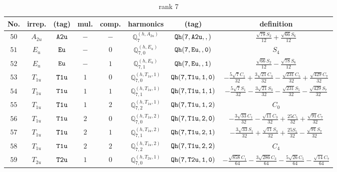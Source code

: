 \documentclass[fleqn,8pt]{jsarticle}
\begin{document}
\begin{table}[ht!]
\begin{center}
\caption{rank 7}
\renewcommand{\arraystretch}{1.3}
\begin{tabular}{cccccccc} \hline \hline
No. & irrep. & (tag) & mul. & comp. & harmonics & (tag) & definition \\ \hline
$ 50 $ & $ A_{2u} $ & $ {\tt A2u} $ & $ - $ & $ - $ & $ \mathbb{Q}_{7}^{(h,A_{2u})} $ & $ {\tt Qh(7,A2u,,)} $ & $ \frac{\sqrt{78} S_{2}}{12} + \frac{\sqrt{66} S_{6}}{12} $ \\
$ 51 $ & $ E_{u} $ & $ {\tt Eu} $ & $ - $ & $ 0 $ & $ \mathbb{Q}_{7,0}^{(h,E_{u})} $ & $ {\tt Qh(7,Eu,,0)} $ & $ S_{4} $ \\
$ 52 $ & $ E_{u} $ & $ {\tt Eu} $ & $ - $ & $ 1 $ & $ \mathbb{Q}_{7,1}^{(h,E_{u})} $ & $ {\tt Qh(7,Eu,,1)} $ & $ \frac{\sqrt{66} S_{2}}{12} - \frac{\sqrt{78} S_{6}}{12} $ \\
$ 53 $ & $ T_{1u} $ & $ {\tt T1u} $ & $ 1 $ & $ 0 $ & $ \mathbb{Q}_{7,0}^{(h,T_{1u},1)} $ & $ {\tt Qh(7,T1u,1,0)} $ & $ - \frac{5 \sqrt{7} C_{1}}{32} + \frac{3 \sqrt{21} C_{3}}{32} - \frac{\sqrt{231} C_{5}}{32} + \frac{\sqrt{429} C_{7}}{32} $ \\
$ 54 $ & $ T_{1u} $ & $ {\tt T1u} $ & $ 1 $ & $ 1 $ & $ \mathbb{Q}_{7,1}^{(h,T_{1u},1)} $ & $ {\tt Qh(7,T1u,1,1)} $ & $ - \frac{5 \sqrt{7} S_{1}}{32} - \frac{3 \sqrt{21} S_{3}}{32} - \frac{\sqrt{231} S_{5}}{32} - \frac{\sqrt{429} S_{7}}{32} $ \\
$ 55 $ & $ T_{1u} $ & $ {\tt T1u} $ & $ 1 $ & $ 2 $ & $ \mathbb{Q}_{7,2}^{(h,T_{1u},1)} $ & $ {\tt Qh(7,T1u,1,2)} $ & $ C_{0} $ \\
$ 56 $ & $ T_{1u} $ & $ {\tt T1u} $ & $ 2 $ & $ 0 $ & $ \mathbb{Q}_{7,0}^{(h,T_{1u},2)} $ & $ {\tt Qh(7,T1u,2,0)} $ & $ - \frac{3 \sqrt{33} C_{1}}{32} - \frac{\sqrt{11} C_{3}}{32} + \frac{25 C_{5}}{32} + \frac{\sqrt{91} C_{7}}{32} $ \\
$ 57 $ & $ T_{1u} $ & $ {\tt T1u} $ & $ 2 $ & $ 1 $ & $ \mathbb{Q}_{7,1}^{(h,T_{1u},2)} $ & $ {\tt Qh(7,T1u,2,1)} $ & $ - \frac{3 \sqrt{33} S_{1}}{32} + \frac{\sqrt{11} S_{3}}{32} + \frac{25 S_{5}}{32} - \frac{\sqrt{91} S_{7}}{32} $ \\
$ 58 $ & $ T_{1u} $ & $ {\tt T1u} $ & $ 2 $ & $ 2 $ & $ \mathbb{Q}_{7,2}^{(h,T_{1u},2)} $ & $ {\tt Qh(7,T1u,2,2)} $ & $ C_{4} $ \\
$ 59 $ & $ T_{2u} $ & $ {\tt T2u} $ & $ 1 $ & $ 0 $ & $ \mathbb{Q}_{7,0}^{(h,T_{2u},1)} $ & $ {\tt Qh(7,T2u,1,0)} $ & $ - \frac{\sqrt{858} C_{1}}{64} - \frac{3 \sqrt{286} C_{3}}{64} - \frac{5 \sqrt{26} C_{5}}{64} - \frac{\sqrt{14} C_{7}}{64} $ \\

\end{tabular}
\end{center}
\end{table}
\end{document}
